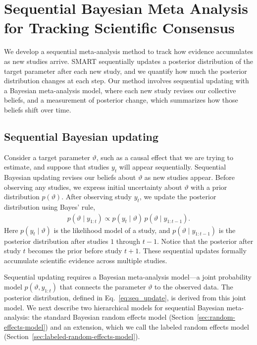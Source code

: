 \section{Sequential Bayesian Meta Analysis for Tracking Scientific Consensus}
\label{Sec:QuantifyingLearning}

We develop a sequential meta-analysis method to track how evidence accumulates as new studies arrive. SMART sequentially updates a posterior distribution of the target parameter after each new study, and we quantify how much the posterior distribution changes at each step. Our method involves sequential updating with a Bayesian meta-analysis model, where each new study revises our collective beliefs, and a measurement of posterior change, which summarizes how those beliefs shift over time.

\subsection{Sequential Bayesian updating}
Consider a target parameter $\vartheta$, such as a causal effect that we are trying to estimate, and suppose that studies $y_t$ will appear sequentially. Sequential Bayesian updating revises our beliefs about $\vartheta$ as new studies appear.  Before observing any studies, we express initial uncertainty about $\vartheta$ with a prior distribution $p(\vartheta)$. After observing study $y_t$, we update the posterior distribution using Bayes' rule,
\begin{align}
  \label{eq:seq_update}
  p(\vartheta \mid y_{1:t})
  \propto p(y_t \mid \vartheta)\,p(\vartheta \mid y_{1:t-1}).
\end{align}
Here $p(y_t \mid \vartheta)$ is the likelihood model of a study, and $p(\vartheta \mid y_{1:t-1})$ is the posterior distribution after studies $1$ through $t-1$. Notice that the posterior after study $t$ becomes the prior before study $t+1$. These sequential updates formally accumulate scientific evidence across multiple studies.

Sequential updating requires a Bayesian meta-analysis model---a joint probability model $p(\vartheta, y_{1:t})$ that connects the parameter $\vartheta$ to the observed data. The posterior distribution, defined in Eq.~\ref{eq:seq_update}, is derived from this joint model. We next describe two hierarchical models for sequential Bayesian meta-analysis: the standard Bayesian random effects model (Section~\ref{sec:random-effects-model}) and an extension, which we call the labeled random effects model (Section~\ref{sec:labeled-random-effects-model}).

